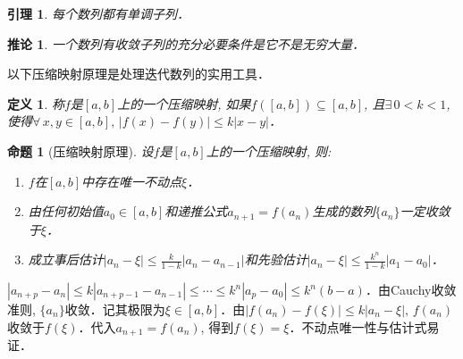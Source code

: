 \documentclass[11pt,a4paper]{ctexart}
\makeatletter
\theoremstyle{thmseries} %
\newtheorem{cor}{推论}[section]
\newtheorem{prop}{命题}[section]
\newtheorem{lem}{引理}[section]
\theoremstyle{exerseries}
\newtheorem{defn}{定义}[section]
\newtheorem{exer}{习题}[section]
\newtheorem*{rem}{注}
\renewenvironment{proof}[1][\proofname]{\par
  \pushQED{\qed}%
  \normalfont \topsep6\p@\@plus6\p@\relax
  \trivlist
  \item[\hskip\labelsep
        \itshape
    #1\@addpunct{}]\ignorespaces
}{%
  \popQED\endtrivlist\@endpefalse
}
\newenvironment{pf}{\begin{proof}[\bfseries\upshape 证\quad]}{\end{proof}}
\newcommand{\bra}[1]{\mathopen{}\left(#1\right)}
\makeatother
\begin{document}

\begin{lem}
	每个数列都有单调子列．
\end{lem}

\begin{cor}
	一个数列有收敛子列的充分必要条件是它不是无穷大量．
\end{cor}

以下压缩映射原理是处理迭代数列的实用工具．
\begin{defn}
	称$f$是$[a,b]$上的一个压缩映射, 如果$f\bra{[a,b]}\subseteq[a,b]$, 且$\exists\,0<k<1$, 使得$\forall\,x,y\in[a,b],\,|f(x)-f(y)|\leq k|x-y|$．
\end{defn}

\begin{prop}[压缩映射原理]
	设$f$是$[a,b]$上的一个压缩映射, 则: 
	\begin{enumerate}
		\item $f$在$[a,b]$中存在唯一不动点$\xi$．
		\item 由任何初始值$a_0\in[a,b]$和递推公式$a_{n+1}=f(a_n)$生成的数列$\{a_n\}$一定收敛于$\xi$．
		\item 成立事后估计$|a_n-\xi|\leq\frac{k}{1-k}|a_n-a_{n-1}|$和先验估计$|a_n-\xi|\leq\frac{k^n}{1-k}|a_1-a_0|$．
	\end{enumerate}
\end{prop}
\begin{pf}
	$|a_{n+p}-a_n|\leq k|a_{n+p-1}-a_{n-1}|\leq\cdots\leq k^n|a_p-a_0|\leq k^n(b-a)$．由Cauchy收敛准则, $\{a_n\}$收敛．记其极限为$\xi\in[a,b]$．由$|f(a_n)-f(\xi)|\leq k|a_n-\xi|,\,f(a_n)$收敛于$f(\xi)$．代入$a_{n+1}=f(a_n)$, 得到$f(\xi)=\xi$．不动点唯一性与估计式易证．
\end{pf}

\end{document}
